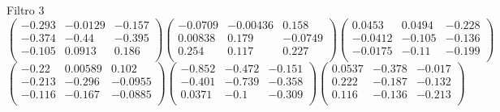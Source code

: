 Filtro 3
{ \small
\[
\begin{pmatrix}
  -0.293 & -0.0129 & -0.157 \\
  -0.374 & -0.44 & -0.395 \\
  -0.105 & 0.0913 & 0.186 \\
\end{pmatrix}
\begin{pmatrix}
  -0.0709 & -0.00436 & 0.158 \\
  0.00838 & 0.179 & -0.0749 \\
  0.254 & 0.117 & 0.227 \\
\end{pmatrix}
\begin{pmatrix}
  0.0453 & 0.0494 & -0.228 \\
  -0.0412 & -0.105 & -0.136 \\
  -0.0175 & -0.11 & -0.199 \\
\end{pmatrix}
\]
\[
\begin{pmatrix}
  -0.22 & 0.00589 & 0.102 \\
  -0.213 & -0.296 & -0.0955 \\
  -0.116 & -0.167 & -0.0885 \\
\end{pmatrix}
\begin{pmatrix}
  -0.852 & -0.472 & -0.151 \\
  -0.401 & -0.739 & -0.358 \\
  0.0371 & -0.1 & -0.309 \\
\end{pmatrix}
\begin{pmatrix}
  0.0537 & -0.378 & -0.017 \\
  0.222 & -0.187 & -0.132 \\
  0.116 & -0.136 & -0.213 \\
\end{pmatrix}
\]
}

